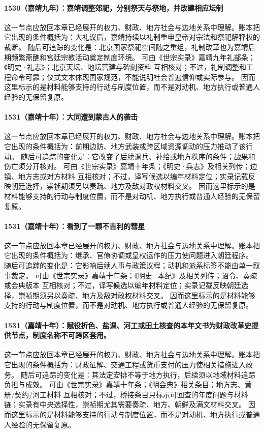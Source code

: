 \paragraph{1530（嘉靖九年）：嘉靖调整郊祀，分别祭天与祭地，并改建相应坛制} 这一节点应放回本章已经展开的权力、财政、地方社会与边地关系中理解。账本把它出现的条件概括为：大礼议后，嘉靖持续以礼制重申皇帝对宗法和祭祀解释权的裁断。 随后可追踪的变化是：北京国家祭祀空间随之重组，礼制改革也为嘉靖后期频繁斋醮和宫廷宗教活动奠定制度环境。 可由《世宗实录》嘉靖九年礼部条；《明史·礼志》；北京天坛、地坛营建与碑刻资料 互相核对；不过，礼制调整和工程命令可靠；仪式文本体现国家规范，不能说明社会普遍信仰或实际参与。 因而这里标示的是材料能够支持的行动与制度位置，而不是对动机、地方执行或普通人经验的无保留复原。

\paragraph{1531（嘉靖十年）：大同遭到蒙古人的袭击} 这一节点应放回本章已经展开的权力、财政、地方社会与边地关系中理解。账本把它出现的条件概括为：前期边防、地方武装或跨区域资源调动的压力推动了该行动。 随后可追踪的变化是：它改变了后续调兵、补给或地方秩序的条件；战果和伤亡须分开核对。 可由《世宗实录》嘉靖十年条；《明史·兵志》及相关列传；边镇、地方志或对方材料 互相核对；不过，译写候选以编年材料定位；实录记载反映朝廷选择，崇祯期须另以奏疏、地方及敌对政权材料交叉。 因而这里标示的是材料能够支持的行动与制度位置，而不是对动机、地方执行或普通人经验的无保留复原。

\paragraph{1531（嘉靖十年）：看到了一颗不吉利的彗星} 这一节点应放回本章已经展开的权力、财政、地方社会与边地关系中理解。账本把它出现的条件概括为：继承、官僚协调或皇权运作的压力使问题进入朝廷程序。 随后可追踪的变化是：它影响后续人事与政策议程；动机和派系标签不能由单一叙事裁定。 可由《世宗实录》嘉靖十年条；《明史·本纪》及相关列传；诏令、奏疏或会典版本 互相核对；不过，译写候选以编年材料定位；实录记载反映朝廷选择，崇祯期须另以奏疏、地方及敌对政权材料交叉。 因而这里标示的是材料能够支持的行动与制度位置，而不是对动机、地方执行或普通人经验的无保留复原。

\paragraph{1531（嘉靖十年）：赋役折色、盐课、河工或田土核查的本年文书为财政改革史提供节点，制度名称不可跨区套用。} 这一节点应放回本章已经展开的权力、财政、地方社会与边地关系中理解。账本把它出现的条件概括为：财政征解、交通工程或货币支付的压力使相关措施进入政务。 随后可追踪的变化是：其法定安排不等于地方执行，后续须以地域材料追踪负担与成效。 可由《世宗实录》嘉靖十年条；《明会典》相关条目；地方志、黄册/契约/河工材料 互相核对；不过，桥接条目只标示可回查的年度问题与材料链；实录有中央选择性，崇祯期尤其需要奏疏、地方、朝鲜及满文材料交叉。 因而这里标示的是材料能够支持的行动与制度位置，而不是对动机、地方执行或普通人经验的无保留复原。

